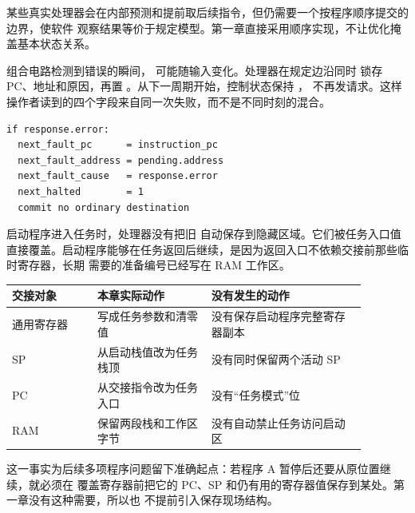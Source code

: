 某些真实处理器会在内部预测和提前取后续指令，但仍需要一个按程序顺序提交的边界，使软件
观察结果等价于规定模型。第一章直接采用顺序实现，不让优化掩盖基本状态关系。


组合电路检测到错误的瞬间， 可能随输入变化。处理器在规定边沿同时
锁存 PC、地址和原因，再置 。从下一周期开始，控制状态保持 ，
不再发请求。这样操作者读到的四个字段来自同一次失败，而不是不同时刻的混合。

\begin{lstlisting}
if response.error:
  next_fault_pc      = instruction_pc
  next_fault_address = pending.address
  next_fault_cause   = response.error
  next_halted        = 1
  commit no ordinary destination
\end{lstlisting}


启动程序进入任务时，处理器没有把旧  自动保存到隐藏区域。它们被任务入口值
直接覆盖。启动程序能够在任务返回后继续，是因为返回入口不依赖交接前那些临时寄存器，长期
需要的准备编号已经写在 RAM 工作区。

\begin{longtable}{|L{0.21\linewidth}|L{0.29\linewidth}|L{0.38\linewidth}|}
\hline
{}
交接对象 & 本章实际动作 & 没有发生的动作 \\ \hline
通用寄存器 & 写成任务参数和清零值 & 没有保存启动程序完整寄存器副本 \\ \hline
SP & 从启动栈值改为任务栈顶 & 没有同时保留两个活动 SP \\ \hline
PC & 从交接指令改为任务入口 & 没有“任务模式”位 \\ \hline
RAM & 保留两段栈和工作区字节 & 没有自动禁止任务访问启动区 \\ \hline
\end{longtable}

这一事实为后续多项程序问题留下准确起点：若程序 A 暂停后还要从原位置继续，就必须在
覆盖寄存器前把它的 PC、SP 和仍有用的寄存器值保存到某处。第一章没有这种需要，所以也
不提前引入保存现场结构。

